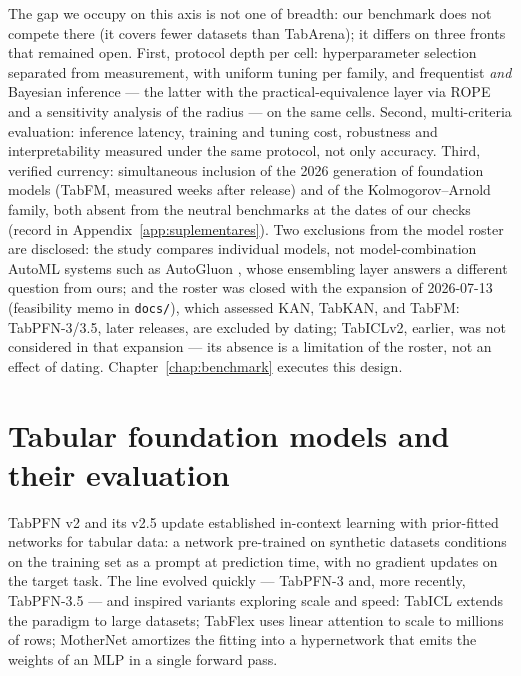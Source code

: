 The gap we occupy on this axis is not one of breadth: our benchmark
does not compete there (it covers fewer datasets than TabArena);
it differs on three fronts that remained open. First, protocol depth
per cell: hyperparameter selection separated from measurement, with
uniform tuning per family, and frequentist \emph{and} Bayesian
inference --- the latter with the practical-equivalence layer via
ROPE \citep{benavoli2017} and a sensitivity analysis of the radius
--- on the same cells. Second, multi-criteria evaluation: inference
latency, training and tuning cost, robustness and interpretability
measured under the same protocol, not only accuracy. Third, verified
currency: simultaneous inclusion of the 2026 generation of
foundation models (TabFM, measured weeks after release) and of the
Kolmogorov--Arnold family, both absent from the neutral benchmarks
at the dates of our checks (record in
Appendix~\ref{app:suplementares}). Two exclusions from the model
roster are disclosed: the study compares individual models, not
model-combination AutoML systems such as AutoGluon
\citep{erickson2020}, whose ensembling layer answers a different
question from ours; and the roster was closed with the expansion of
2026-07-13 (feasibility memo in \texttt{docs/}), which assessed KAN,
TabKAN, and TabFM: TabPFN-3/3.5, later releases, are excluded by
dating; TabICLv2,
earlier, was not considered in that expansion --- its absence is a
limitation of the roster, not an effect of dating.
Chapter~\ref{chap:benchmark} executes this design.

\section{Tabular foundation models and their evaluation}
\label{sec:rel-tfm}

TabPFN v2 \citep{hollmann2025} and its v2.5 update
\citep{priorlabs2025} established in-context learning with
prior-fitted networks for tabular data: a network pre-trained on
synthetic datasets conditions on the training set as a prompt at
prediction time, with no gradient updates on the target task. The
line evolved quickly --- TabPFN-3 \citep{tabpfn3-2026} and, more
recently, TabPFN-3.5 \citep{tabpfn35tr2026} --- and inspired
variants exploring scale and
speed: TabICL \citep{tabicl2025} extends the paradigm to large
datasets; TabFlex \citep{tabflex2025} uses linear attention to scale
to millions of rows; MotherNet \citep{mothernet2023} amortizes the
fitting into a hypernetwork that emits the weights of an MLP in a
single forward pass.

